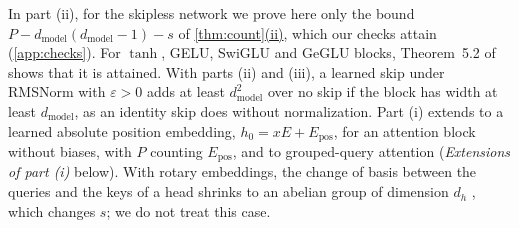 \documentclass[10pt]{article}
\theoremstyle{definition}
\theoremstyle{remark}
\newcommand{\dm}{d_{\mathrm{model}}}
\DeclareRobustCommand{\cpref}[2]{\hyperref[#1:#2]{\cref*{#1}(#2)}}
\newcommand{\KDdepth}{5.2}    %
\begin{document}
In part (ii), for the skipless network we prove here only the bound $P - \dm(\dm-1) - s$ of \cpref{thm:count}{ii}, which our checks attain (\cref{app:checks}). For $\tanh$, GELU, SwiGLU and GeGLU blocks, Theorem~\KDdepth{} of \citet{karbevski2026dimension} shows that it is attained. With parts (ii) and (iii), a learned skip under RMSNorm with $\varepsilon > 0$ adds at least $\dm^2$ over no skip if the block has width at least $\dm$, as an identity skip does without normalization. Part (i) extends to a learned absolute position embedding, $h_0 = xE + E_{\mathrm{pos}}$, for an attention block without biases, with $P$ counting $E_{\mathrm{pos}}$, and to grouped-query attention (\emph{Extensions of part (i)} below). With rotary embeddings, the change of basis between the queries and the keys of a head shrinks to an abelian group of dimension $d_h$ \citep[Theorem~4.2]{tran2026equivalence}, which changes $s$; we do not treat this case.
\end{document}
